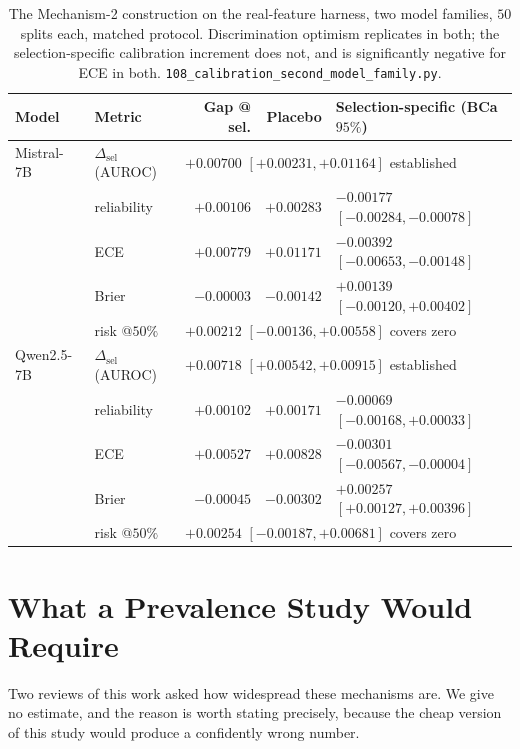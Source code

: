 \documentclass{article}
\begin{document}
\begin{table}[h]
\centering
\small
{\setlength{\tabcolsep}{4pt}
\begin{tabular}{@{}llrrl@{}}
\toprule
Model & Metric & Gap @ sel. & Placebo & Selection-specific (BCa $95\%$) \\
\midrule
Mistral-7B  & $\Delta_\text{sel}$ (AUROC) & \multicolumn{3}{l}{$+0.00700$ $[+0.00231,+0.01164]$ \quad established} \\
            & reliability & $+0.00106$ & $+0.00283$ & $-0.00177$ $[-0.00284,-0.00078]$ \\
            & ECE         & $+0.00779$ & $+0.01171$ & $-0.00392$ $[-0.00653,-0.00148]$ \\
            & Brier       & $-0.00003$ & $-0.00142$ & $+0.00139$ $[-0.00120,+0.00402]$ \\
            & risk @$50\%$ & \multicolumn{3}{l}{$+0.00212$ $[-0.00136,+0.00558]$ \quad covers zero} \\
\midrule
Qwen2.5-7B  & $\Delta_\text{sel}$ (AUROC) & \multicolumn{3}{l}{$+0.00718$ $[+0.00542,+0.00915]$ \quad established} \\
            & reliability & $+0.00102$ & $+0.00171$ & $-0.00069$ $[-0.00168,+0.00033]$ \\
            & ECE         & $+0.00527$ & $+0.00828$ & $-0.00301$ $[-0.00567,-0.00004]$ \\
            & Brier       & $-0.00045$ & $-0.00302$ & $+0.00257$ $[+0.00127,+0.00396]$ \\
            & risk @$50\%$ & \multicolumn{3}{l}{$+0.00254$ $[-0.00187,+0.00681]$ \quad covers zero} \\
\bottomrule
\end{tabular}}
\caption{The Mechanism-2 construction on the real-feature harness, two model
families, $50$ splits each, matched protocol. Discrimination optimism
replicates in both; the selection-specific calibration increment does not, and
is significantly negative for ECE in both.
\texttt{108\_calibration\_second\_model\_family.py}.}
\label{tab:secondfamily}
\end{table}

\section{What a Prevalence Study Would Require}
\label{app:prevalence}

Two reviews of this work asked how widespread these mechanisms are. We give no
estimate, and the reason is worth stating precisely, because the cheap version
of this study would produce a confidently wrong number.
\end{document}
